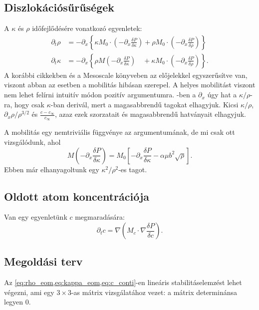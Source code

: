 \documentclass[10pt,a4paper]{scrartcl}
\begin{document}
\subsection{Diszlokációsűrűségek} A $\kappa$ és $\rho$ időfejlődésére vonatkozó egyenletek:
\begin{align} \label{eq:rho_eom}
  {\partial _t}\rho  & =  - {\partial _x}\left\{ {\kappa {M_0} \cdot \left( { - {\partial _x}\frac{{\delta P}}{{\delta \kappa }}} \right) + \rho {M_0} \cdot \left( { - {\partial _x}\frac{{\delta P}}{{\delta \rho }}} \right)} \right\} \\
  {\partial _t}\kappa  & =  - {\partial _x}\left\{ {\rho M\left( { - {\partial _x}\frac{{\delta P}}{{\delta \kappa }}} \right)\quad  + \kappa {M_0} \cdot \left( { - {\partial _x}\frac{{\delta P}}{{\delta \rho }}} \right)} \right\}. \label{eq:kappa_eom}
\end{align}
A korábbi cikkekben és a Mesoscale könyveben az előjelekkel egyszerűsítve van, viszont abban az esetben a mobilitás hibásan szerepel. A helyes mobilitást viszont nem lehet felírni intuitív módon pozitív argumentumra. -ben a $\partial_x$ úgy hat a $\kappa /\rho $-ra, hogy csak $\kappa$-ban derivál, mert a magasabbrendű tagokat elhagyjuk. Kicsi $\kappa /\rho $, ${\partial _x}\rho /{\rho ^{3/2}}$ és $\frac{{c - {c_\infty }}}{{{c_\infty }}}$, azaz ezek szorzatait és magasabbrendű hatványait elhagyjuk.

A mobilitás egy nemtriviális függvénye az argumentumának, de mi csak ott vizsgálódunk, ahol 
\begin{equation} \label{eq:nontriv_mobility}
M\left( { - {\partial _x}\frac{{\delta P}}{{\delta \kappa }}} \right) = {M_0}\left[ { - {\partial _x}\frac{{\delta P}}{{\delta \kappa }} - \alpha \mu {b^2}\sqrt \rho} \right].
\end{equation}
Ebben már elhanyagoltunk egy $ \kappa ^2 / \rho ^2 $-es tagot.

\subsection{Oldott atom koncentrációja} Van egy egyenletünk $c$ megmaradására:
\begin{equation} \label{eq:c_conti}
\partial_t c =  \nabla \left( {{M_c} \cdot \nabla \frac{{\delta P}}{{\delta c}}} \right).
\end{equation}

\subsection{Megoldási terv}
Az \cref{eq:rho_eom,eq:kappa_eom,eq:c_conti}-en lineáris stabilitáselemzést lehet végezni, ami egy $3\times3$-as mátrix vizsgálatához vezet: a mátrix determinánsa legyen 0.
\end{document}
